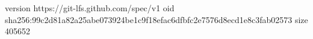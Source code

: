 version https://git-lfs.github.com/spec/v1
oid sha256:99c2d81a82a25abe073924be1c9f18efac6dfbfc2e7576d8ecd1e8c3fab02573
size 405652
